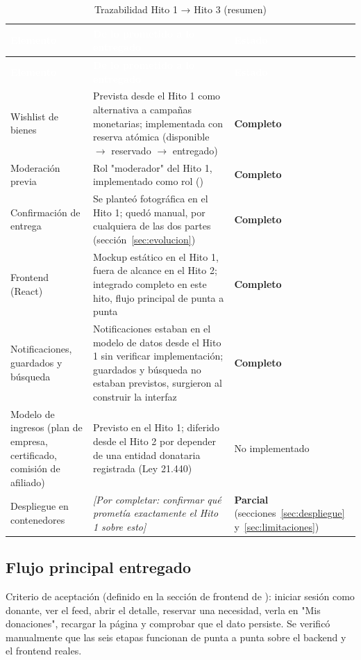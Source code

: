 \documentclass[11pt,letterpaper]{article}
\newcommand{\code}[1]{\texttt{\detokenize{#1}}}
\newcommand{\hc}[1]{\textcolor{white}{\sffamily\bfseries #1}}
\newcommand{\ok}[1]{\textcolor{mayorgreen}{\bfseries #1}}
\newcommand{\errs}[1]{\textcolor{dangerred}{\small #1}}
\newcommand{\porcompletar}[1]{\textcolor{robinorange}{\textit{[Por completar: #1]}}}
\newcommand{\tablestyle}{\rowcolors{2}{white}{softgreen}\arrayrulecolor{lightgreen}\small}
\begin{document}
{\tablestyle
\begin{longtable}{@{}>{\raggedright\arraybackslash}p{3.6cm}>{\raggedright\arraybackslash}p{7.3cm}>{\centering\arraybackslash}p{2.6cm}@{}}
\caption{Trazabilidad Hito 1 → Hito 3 (resumen)}\\
\rowcolor{mayorgreen}\hc{Elemento} & \hc{De lo prometido a lo entregado} & \hc{Estado}\\
\endfirsthead
\rowcolor{mayorgreen}\hc{Elemento} & \hc{De lo prometido a lo entregado} & \hc{Estado}\\
\endhead
Wishlist de bienes & Prevista desde el Hito 1 como alternativa a campañas monetarias; implementada con reserva atómica (disponible $\rightarrow$ reservado $\rightarrow$ entregado) & \ok{Completo}\\
Moderación previa & Rol "moderador" del Hito 1, implementado como rol \code{admin} ({\scriptsize\code{PATCH /publications/\{id\}/status}}) & \ok{Completo}\\
Confirmación de entrega & Se planteó fotográfica en el Hito 1; quedó manual, por cualquiera de las dos partes (sección~\ref{sec:evolucion}) & \ok{Completo}\\
Frontend (React) & Mockup estático en el Hito 1, fuera de alcance en el Hito 2; integrado completo en este hito, flujo principal de punta a punta & \ok{Completo}\\
Notificaciones, guardados y búsqueda & Notificaciones estaban en el modelo de datos desde el Hito 1 sin verificar implementación; guardados y búsqueda no estaban previstos, surgieron al construir la interfaz & \ok{Completo}\\
Modelo de ingresos (plan de empresa, certificado, comisión de afiliado) & Previsto en el Hito 1; diferido desde el Hito 2 por depender de una entidad donataria registrada (Ley 21.440) & \errs{No implementado}\\
Despliegue en contenedores & \porcompletar{confirmar qué prometía exactamente el Hito 1 sobre esto} & \textcolor{robinorange}{\bfseries Parcial} (secciones~\ref{sec:despliegue} y~\ref{sec:limitaciones})\\
\end{longtable}}

\subsection{Flujo principal entregado}

Criterio de aceptación (definido en la sección de frontend de \code{CLAUDE.md}): iniciar sesión como donante, ver el feed, abrir el detalle, reservar una necesidad, verla en "Mis donaciones", recargar la página y comprobar que el dato persiste. Se verificó manualmente que las seis etapas funcionan de punta a punta sobre el backend y el frontend reales.
\end{document}
